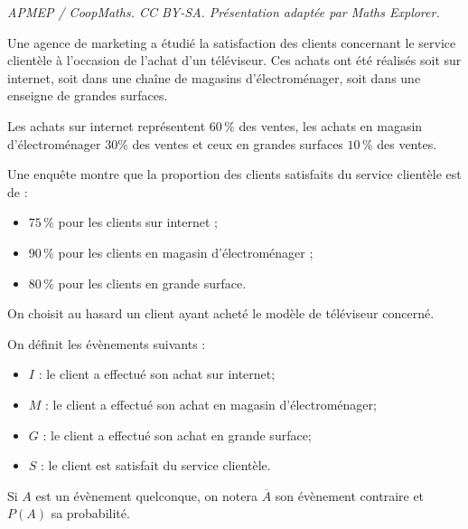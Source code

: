 \documentclass[10pt]{article}
\begin{document}
\noindent\textit{APMEP / CoopMaths. CC BY-SA. Présentation adaptée par Maths Explorer.}\par\medskip
\medskip

Une agence de marketing a étudié la satisfaction des clients concernant le service clientèle à l'occasion de l'achat d'un téléviseur. Ces achats ont été réalisés soit sur internet, soit dans une chaîne de magasins d'électroménager, soit dans une enseigne de grandes surfaces.

Les achats sur internet représentent $60\,\%$ des ventes, les achats en magasin d'électroménager $30 \%$ des ventes et ceux en grandes surfaces $10\,\%$ des ventes.

Une enquête montre que la proportion des clients satisfaits du service clientèle est de :
\begin{itemize}
	\item $75\,\%$ pour les clients sur internet ;
	\item $90\,\%$ pour les clients en magasin d'électroménager ;
	\item $80\,\%$ pour les clients en grande surface.
\end{itemize}

On choisit au hasard un client ayant acheté le modèle de téléviseur concerné.

On définit les évènements suivants :

\begin{itemize}
	\item $I$ : \og le client a effectué son achat sur internet\fg{};
	\item $M$ : \og le client a effectué son achat en magasin d'électroménager\fg{};
	\item $G$ : \og le client a effectué son achat en grande surface\fg{};
	\item $S$ : \og le client est satisfait du service clientèle\fg{}.
\end{itemize}

Si $A$ est un évènement quelconque, on notera $\overline{A}$ son évènement contraire et $P(A)$ sa probabilité.
\end{document}
